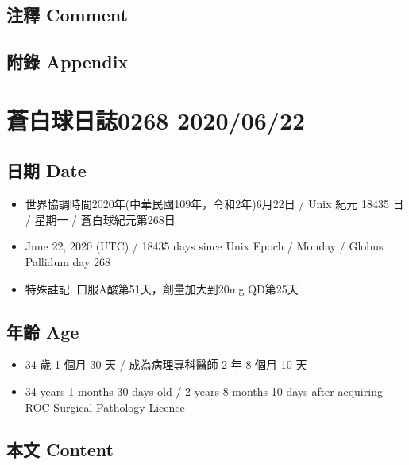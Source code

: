 \documentclass[
]{article}
\providecommand{\tightlist}{%
  \setlength{\itemsep}{0pt}\setlength{\parskip}{0pt}}
\begin{document}
\hypertarget{ux6ce8ux91cb-comment-18}{%
\subsection{注釋 Comment}\label{ux6ce8ux91cb-comment-18}}

\hypertarget{ux9644ux9304-appendix-18}{%
\subsection{附錄 Appendix}\label{ux9644ux9304-appendix-18}}

\hypertarget{ux84bcux767dux7403ux65e5ux8a8c0268-20200622}{%
\section{蒼白球日誌0268
2020/06/22}\label{ux84bcux767dux7403ux65e5ux8a8c0268-20200622}}

\hypertarget{ux65e5ux671f-date-19}{%
\subsection{日期 Date}\label{ux65e5ux671f-date-19}}

\begin{itemize}
\tightlist
\item
  世界協調時間2020年(中華民國109年，令和2年)6月22日 / Unix 紀元 18435 日
  / 星期一 / 蒼白球紀元第268日
\item
  June 22, 2020 (UTC) / 18435 days since Unix Epoch / Monday / Globus
  Pallidum day 268
\item
  特殊註記: 口服A酸第51天，劑量加大到20mg QD第25天
\end{itemize}

\hypertarget{ux5e74ux9f61-age-19}{%
\subsection{年齡 Age}\label{ux5e74ux9f61-age-19}}

\begin{itemize}
\tightlist
\item
  34 歲 1 個月 30 天 / 成為病理專科醫師 2 年 8 個月 10 天
\item
  34 years 1 months 30 days old / 2 years 8 months 10 days after
  acquiring ROC Surgical Pathology Licence
\end{itemize}

\hypertarget{ux672cux6587-content-19}{%
\subsection{本文 Content}\label{ux672cux6587-content-19}}
\end{document}
